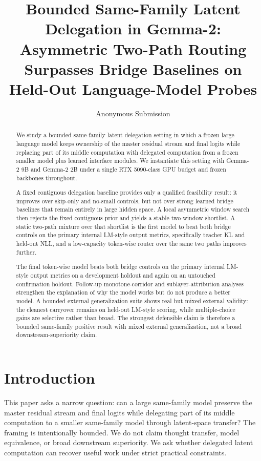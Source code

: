 \documentclass[11pt]{article}
\title{Bounded Same-Family Latent Delegation in Gemma-2:\\Asymmetric Two-Path Routing Surpasses Bridge Baselines on Held-Out Language-Model Probes}
\author{Anonymous Submission}
\date{}
\begin{document}
\maketitle

\begin{abstract}
We study a bounded same-family latent delegation setting in which a frozen large language model keeps ownership of the master residual stream and final logits while replacing part of its middle computation with delegated computation from a frozen smaller model plus learned interface modules. We instantiate this setting with Gemma-2 9B and Gemma-2 2B under a single RTX 5090-class GPU budget and frozen backbones throughout.

A fixed contiguous delegation baseline provides only a qualified feasibility result: it improves over skip-only and no-small controls, but not over strong learned bridge baselines that remain entirely in large hidden space. A local asymmetric window search then rejects the fixed contiguous prior and yields a stable two-window shortlist. A static two-path mixture over that shortlist is the first model to beat both bridge controls on the primary internal LM-style output metrics, specifically teacher KL and held-out NLL, and a low-capacity token-wise router over the same two paths improves further.

The final token-wise model beats both bridge controls on the primary internal LM-style output metrics on a development holdout and again on an untouched confirmation holdout. Follow-up monotone-corridor and sublayer-attribution analyses strengthen the explanation of why the model works but do not produce a better model. A bounded external generalization suite shows real but mixed external validity: the cleanest carryover remains on held-out LM-style scoring, while multiple-choice gains are selective rather than broad. The strongest defensible claim is therefore a bounded same-family positive result with mixed external generalization, not a broad downstream-superiority claim.
\end{abstract}

\section{Introduction}

This paper asks a narrow question: can a large same-family model preserve the master residual stream and final logits while delegating part of its middle computation to a smaller same-family model through latent-space transfer? The framing is intentionally bounded. We do not claim thought transfer, model equivalence, or broad downstream superiority. We ask whether delegated latent computation can recover useful work under strict practical constraints.
\end{document}
